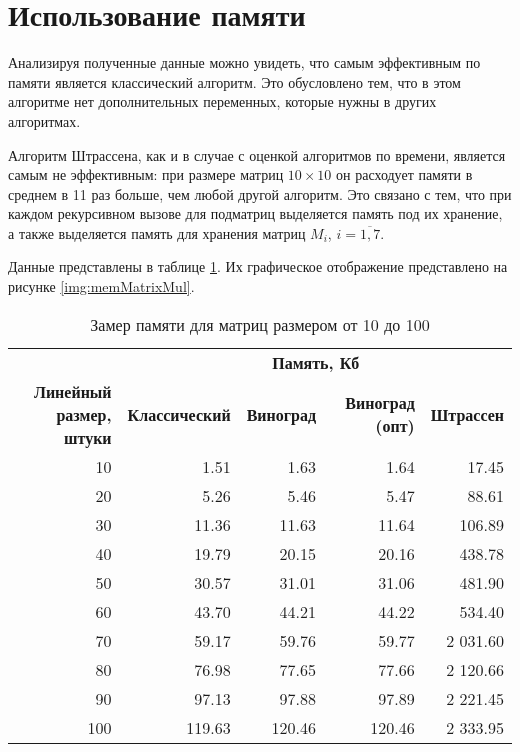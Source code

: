 \section{Использование памяти}

Анализируя полученные данные можно увидеть, что самым эффективным по памяти является классический алгоритм. Это обусловлено тем, что в этом алгоритме нет дополнительных переменных, которые нужны в других алгоритмах.

Алгоритм Штрассена, как и в случае с оценкой алгоритмов по времени, является самым не эффективным: при размере матриц $10 \times 10$ он расходует памяти в среднем в 11 раз больше, чем любой другой алгоритм. 
Это связано с тем, что при каждом рекурсивном вызове для подматриц выделяется память под их хранение, а также выделяется память для хранения матриц $M_i$, $i = \overline{1, 7}$.

Данные представлены в таблице \ref{tbl:mem}. Их графическое отображение представлено на рисунке \ref{img:memMatrixMul}.

\clearpage

\begin{table}[ht]
	\small
	\begin{center}
		\begin{threeparttable}
			\caption{Замер памяти для матриц размером от 10 до 100}
			\label{tbl:mem}
			\begin{tabular}{|r|r|r|r|r|}
				\hline
				& \multicolumn{4}{c|}{\bfseries Память, Кб} \\ \cline{2-5}
				\bfseries \makecell{Линейный размер, \\ штуки} & \bfseries Классический & \bfseries Виноград & \bfseries Виноград (опт) & \bfseries Штрассен  \\ \cline{2-5}
				\hline
				10 & 1.51 & 1.63 & 1.64 & 17.45 \\
				\hline
				20 & 5.26 & 5.46 & 5.47 & 88.61 \\
				\hline
				30 & 11.36 & 11.63 & 11.64 & 106.89 \\
				\hline
				40 & 19.79 & 20.15 & 20.16 & 438.78 \\
				\hline
				50 & 30.57 & 31.01 & 31.06 & 481.90 \\
				\hline
				60 &  43.70 & 44.21 & 44.22 & 534.40 \\
				\hline
				70 & 59.17 & 59.76 & 59.77 & 2 031.60 \\
				\hline
				80 & 76.98 & 77.65 & 77.66 & 2 120.66 \\
				\hline
				90 & 97.13 & 97.88 & 97.89 & 2 221.45 \\
				\hline
				100 & 119.63 & 120.46 & 120.46 & 2 333.95 \\
				\hline
			\end{tabular}	
		\end{threeparttable}
	\end{center}
\end{table}


